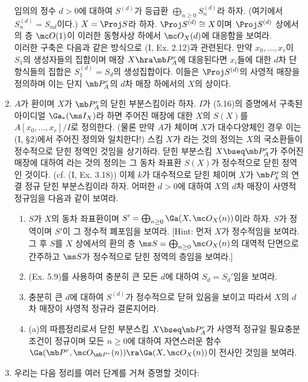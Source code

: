 \begin{enumerate}[label=\tb{5.\arabic*.},itemindent=0mm,itemsep=2mm]
	임의의 정수 $d>0$에 대하여 $S^{(d)}$가 등급환 $\bigoplus_{n\ge 0}S_n^{(d)}$라 하자. (여기에서 $S_n^{(d)}=S_{nd}$이다.)
	$X=\Proj S$라 하자. $\Proj S^{(d)}\cong X$이며
	$\Proj S^{(d)}$ 상에서의 층 $\mc O(1)$이 이러한 동형사상 하에서 $\mc O_X(d)$에 대응함을 보여라.\\
	이러한 구축은 다음과 같은 방식으로 (I, Ex. 2.12)과 관련된다.
	만약 $x_0,\ldots,x_r$이 $S_1$의 생성자들의 집합이며 매장 $X\hra\mb P^r_A$에 대응된다면
	$x_i$들에 대한 $d$차 단항식들의 집합은 $S_1^{(d)}=S_d$의 생성집합이다.
	이들은 $\Proj S^{(d)}$의 사영적 매장을 정의하며 이는 단지 $\mb P^r_A$의 $d$차 매장 하에서의 $X$의 상이다.
	\item $A$가 환이며 $X$가 $\mb P^r_A$의 닫힌 부분스킴이라 하자.
	$I$가 (5.16)의 증명에서 구축된 아이디얼 $\Ga_*(\ms I_X)$라 하면
	주어진 매장에 대한 $X$의  $S(X)$를 $A[x_0,\ldots,x_r]/I$로 정의한다.
	(물론 만약 $A$가 체이며 $X$가 대수다양체인 경우 이는 (I, \S 2)에서 주어진 정의와 일치한다!)
	스킴 $X$가 라는 것의 정의는 $X$의 국소환들이 정수적으로 닫힌 정역인 것임을 상기하라.
	닫힌 부분스킴 $X\bseq\mb P^r_A$가 주어진 매장에 대하여 라는 것의 정의는
	그 동차 좌표환 $S(X)$가 정수적으로 닫힌 정역인 것이다. (cf. (I, Ex. 3.18))
	이제 $k$가 대수적으로 닫힌 체이며 $X$가 $\mb P^r_k$의 연결 정규 닫힌 부분스킴이라 하자.
	어떠한 $d>0$에 대하여 $X$의 $d$차 매장이 사영적 정규임을 다음과 같이 보여라.
	\begin{enumerate}[label=(\alph*)]
	\item $S$가 $X$의 동차 좌표환이며 $S'=\bigoplus_{n\ge 0}\Ga(X,\mc O_X(n))$이라 하자.
	$S$가 정역이며 $S'$이 그 정수적 폐포임을 보여라. [Hint: 먼저 $X$가 정수적임을 보여라.
	그 후 $S$를 $X$ 상에서의 환의 층 $\ms S=\bigoplus_{n\ge 0}\mc O_X(n)$의 대역적 단면으로 간주하고
	$\ms S$가 정수적으로 닫힌 정역의 층임을 보여라.]
	\item (Ex. 5.9)를 사용하여 충분히 큰 모든 $d$에 대하여 $S_d=S_d'$임을 보여라.
	\item 충분히 큰 $d$에 대하여 $S^{(d)}$가 정수적으로 닫혀 있음을 보이고 따라서 $X$의 $d$차 매장이 사영적 정규라 결론지어라.
	\item (a)의 따름정리로서 닫힌 부분스킴 $X\bseq\mb P^r_A$가 사영적 정규일 필요충분조건이 정규이며
	모든 $n\ge 0$에 대하여 자연스러운 함수 $\Ga(\mb P^r,\mc O_{\mb P^r}(n))\ra\Ga(X,\mc O_X(n))$이 전사인 것임을 보여라.
	\end{enumerate}
	\item {} 우리는 다음 정리를 여러 단계를 거쳐 증명할 것이다:

\end{enumerate}

